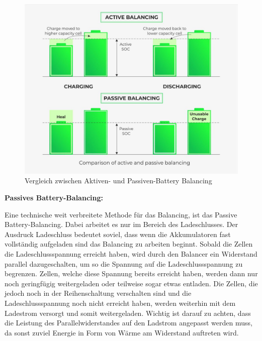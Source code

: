 \begin{figure}[H]
	\begin{center}
		\includegraphics[scale=1.5]{figures/Akku/Vergleichaktivespassives.jpg}
		\caption{Vergleich zwischen Aktiven- und Passiven-Battery Balancing}
	\end{center}
\end{figure}
\newpage

\textbf{Passives Battery-Balancing:}

Eine technische weit verbreitete Methode für das Balancing, ist das Passive Battery-Balancing. Dabei arbeitet es nur im Bereich des Ladeschlusses. Der Ausdruck Ladeschluss bedeutet soviel, dass wenn die Akkumulatoren fast vollständig aufgeladen sind das Balancing zu arbeiten beginnt. Sobald die Zellen die Ladeschlussspannung erreicht haben, wird durch den Balancer ein Widerstand parallel dazugeschalten, um so die Spannung auf die Ladeschlussspannung zu begrenzen. Zellen, welche diese Spannung bereits erreicht haben, werden dann nur noch geringfügig weitergeladen oder teilweise sogar etwas entladen. Die Zellen, die jedoch noch in der Reihenschaltung verschalten sind und die Ladeschlussspannung noch nicht erreicht haben, werden weiterhin mit dem Ladestrom versorgt und somit weitergeladen. Wichtig ist darauf zu achten, dass die Leistung des Parallelwiderstandes auf den Ladstrom angepasst werden muss, da sonst zuviel Energie in Form von Wärme am Widerstand auftreten wird.

